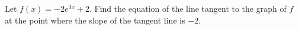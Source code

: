 Let $f(x)=-2e^{3x}+2$. Find the equation of the line tangent to the graph of $f$ at the point where the slope of the tangent line is $-2$.
